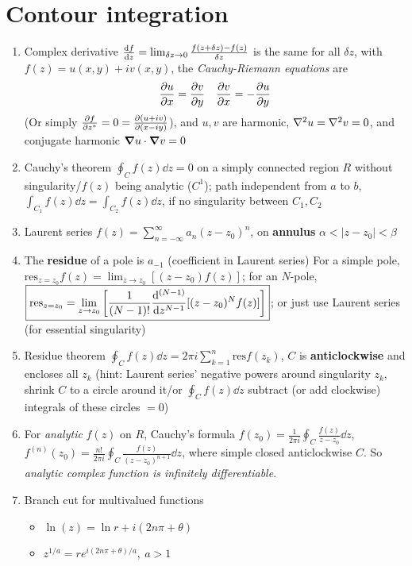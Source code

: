 \documentclass{article}
\theoremstyle{remark}
\theoremstyle{remark}
\begin{document}
\section*{Contour integration}
    \begin{enumerate}
        \item Complex derivative $\dv{f}{z}=\lim_{\delta z\rightarrow0}\frac{f(z+\delta z)-f(z)}{\delta z}$ is the same for all $\delta z$, with $f(z)=u(x,y)+iv(x,y)$, the \textit{Cauchy-Riemann equations} are \[
                \pdv{u}{x}=\pdv{v}{y}\quad\pdv{v}{x}=-\pdv{u}{y}
            \]
            (Or simply $\pdv{f}{z^*}=0=\pdv{(u+iv)}{(x-iy)}$), and $u,v$ are harmonic, $\laplacian{u}=\laplacian{v}=0$, and conjugate harmonic $\grad u\cdot\grad v=0$
        \item Cauchy's theorem $\boxed{\oint_C f(z)\dd z=0}$ on a simply connected region $R$ without singularity/$f(z)$ being analytic ($C^1$); path independent from $a$ to $b$, $\int_{C_1}f(z)\dd z=\int_{C_2}f(z)\dd z$, if no singularity between $C_1,C_2$
        \item Laurent series $\boxed{f(z)=\sum_{n=-\infty}^{\infty}a_n(z-z_0)^n}$, on \textbf{annulus} $\alpha<|z-z_0|<\beta$
        \item The \textbf{residue} of a pole is $a_{-1}$ (coefficient in Laurent series)  For a simple pole, $\mathrm{res}_{z=z_0}f(z)=\lim_{z\rightarrow z_0}\left[(z-z_0)f(z)\right]$; for an $N$-pole, $\boxed{\mathrm{res}_{z=z_0}=\lim_{z\rightarrow z_0}\left[\frac{1}{(N-1)!}\dv{^{(N-1)}}{z^{N-1}}[(z-z_0)^Nf(z)]\right]}$; or just use Laurent series (for essential singularity)
        \item Residue theorem $\boxed{\oint_C f(z)\dd z=2\pi i\sum_{k=1}^n\mathrm{res}f(z_k)}$, $C$ is \textbf{anticlockwise} and encloses all $z_k$ (hint: Laurent series' negative powers around singularity $z_k$, shrink $C$ to a circle around it/or $\oint_Cf(z)\dd z$ subtract (or add clockwise) integrals of these circles $=0$)
        \item For \emph{analytic} $f(z)$ on $R$, Cauchy's formula $\boxed{f(z_0)=\frac{1}{2\pi i}\oint_C\frac{f(z)}{z-z_0}\dd z}$, $f^{(n)}(z_0)=\frac{n!}{2\pi i}\oint_C\frac{f(z)}{(z-z_0)^{n+1}}\dd z$, where simple closed anticlockwise $C$. So \emph{analytic complex function is infinitely differentiable}.
        \item Branch cut for multivalued functions \begin{itemize}
                \item $\ln(z)=\ln r+i(2n\pi+\theta)$
                \item $z^{1/a}=re^{i(2n\pi+\theta)/a},\ a>1$

\end{itemize}
\end{enumerate}
\end{document}
